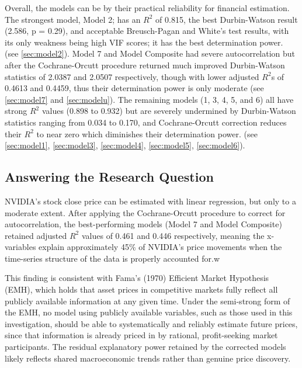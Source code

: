 \documentclass[12pt]{article}
\begin{document}
    Overall, the models can be by their practical reliability for financial estimation. The strongest model, Model 2; has an $R^2$ of 0.815, the best Durbin-Watson result (2.586, p = 0.29), and acceptable Breusch-Pagan and White's test results, with its only weakness being high VIF scores; it has the best determination power. (see \ref{sec:model2}). Model 7 and Model Composite had severe autocorrelation but after the Cochrane-Orcutt procedure returned much improved Durbin-Watson statistics of 2.0387 and 2.0507 respectively, though with lower adjusted $R^2$s of 0.4613 and 0.4459, thus their determination power is only moderate (see \ref{sec:model7} and \ref{sec:modelu}). The remaining models (1, 3, 4, 5, and 6) all have strong $R^2$ values (0.898 to 0.932) but are severely undermined by Durbin-Watson statistics ranging from 0.034 to 0.170, and Cochrane-Orcutt correction reduces their $R^2$ to near zero which diminishes their determination power. (see \ref{sec:model1}, \ref{sec:model3}, \ref{sec:model4}, \ref{sec:model5}, \ref{sec:model6}).
    
    \subsection{Answering the Research Question}
    
    NVIDIA's stock close price can be estimated with linear regression, but only to a moderate extent. After applying the Cochrane-Orcutt procedure to correct for autocorrelation, the best-performing models (Model 7 and Model Composite) retained adjusted $R^2$ values of 0.461 and 0.446 respectively, meaning the x-variables explain approximately 45\% of NVIDIA's price movements when the time-series structure of the data is properly accounted for.w
    
    This finding is consistent with Fama's (1970) Efficient Market Hypothesis (EMH), which holds that asset prices in competitive markets fully reflect all publicly available information at any given time. Under the semi-strong form of the EMH, no model using publicly available variables, such as those used in this investigation, should be able to systematically and reliably estimate future prices, since that information is already priced in by rational, profit-seeking market participants. The residual explanatory power retained by the corrected models likely reflects shared macroeconomic trends rather than genuine price discovery.
    
\end{document}
